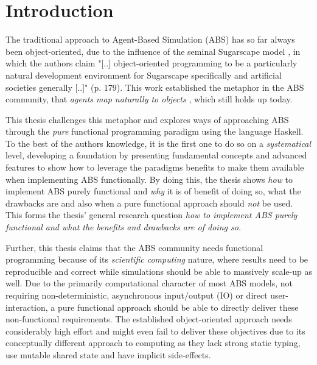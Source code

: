 \chapter{Introduction}
\label{ch:intro}
The traditional approach to Agent-Based Simulation (ABS) has so far always been object-oriented, due to the influence of the seminal Sugarscape model \cite{epstein_growing_1996}, in which the authors claim "[..] object-oriented programming to be a particularly natural development environment for Sugarscape specifically and artificial societies generally [..]" (p. 179). This work established the metaphor in the ABS community, that \textit{agents map naturally to objects} \cite{north_managing_2007}, which still holds up today. %

This thesis challenges this metaphor and explores ways of approaching ABS through the \textit{pure} functional programming paradigm using the language Haskell. To the best of the authors knowledge, it is the first one to do so on a \textit{systematical} level, developing a foundation by presenting fundamental concepts and advanced features to show how to leverage the paradigms benefits \cite{hudak_history_2007} to make them available when implementing ABS functionally. By doing this, the thesis shows \textit{how} to implement ABS purely functional and \textit{why} it is of benefit of doing so, what the drawbacks are and also when a pure functional approach should \textit{not} be used. This forms the thesis' general research question \textit{how to implement ABS purely functional and what the benefits and drawbacks are of doing so.} 

Further, this thesis claims that the ABS community needs functional programming because of its \textit{scientific computing} nature, where results need to be reproducible and correct while simulations should be able to massively scale-up as well. Due to the primarily computational character of most ABS models, not requiring non-deterministic, asynchronous input/output (IO) or direct user-interaction, a pure functional approach should be able to directly deliver these non-functional requirements. The established object-oriented approach needs considerably high effort and might even fail to deliver these objectives due to its conceptually different approach to computing as they lack strong static typing, use mutable shared state and have implicit side-effects. 

